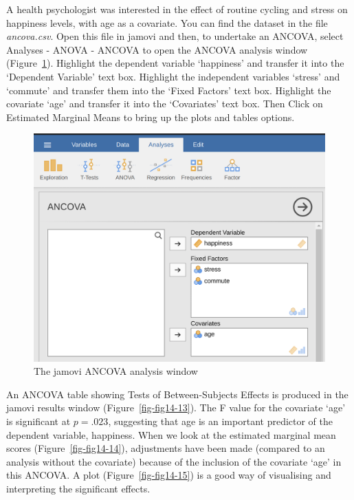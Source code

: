 \documentclass[
  a4paper,
]{book}
\begin{document}
A health psychologist was interested in the effect of routine cycling
and stress on happiness levels, with age as a covariate. You can find
the dataset in the file \emph{ancova.csv}. Open this file in jamovi and
then, to undertake an ANCOVA, select Analyses - ANOVA - ANCOVA to open
the ANCOVA analysis window (Figure~\ref{fig-fig14-12}). Highlight the
dependent variable `happiness' and transfer it into the `Dependent
Variable' text box. Highlight the independent variables `stress' and
`commute' and transfer them into the `Fixed Factors' text box. Highlight
the covariate `age' and transfer it into the `Covariates' text box. Then
Click on Estimated Marginal Means to bring up the plots and tables
options.

\begin{figure}

\includegraphics[width=1\textwidth,height=\textheight]{images/fig14-12.png} \hfill{}

\caption{\label{fig-fig14-12}The jamovi ANCOVA analysis window}

\end{figure}

An ANCOVA table showing Tests of Between-Subjects Effects is produced in
the jamovi results window (Figure~\ref{fig-fig14-13}). The F value for
the covariate `age' is significant at \(p = .023\), suggesting that age
is an important predictor of the dependent variable, happiness. When we
look at the estimated marginal mean scores (Figure~\ref{fig-fig14-14}),
adjustments have been made (compared to an analysis without the
covariate) because of the inclusion of the covariate `age' in this
ANCOVA. A plot (Figure~\ref{fig-fig14-15}) is a good way of visualising
and interpreting the significant effects.
\end{document}
